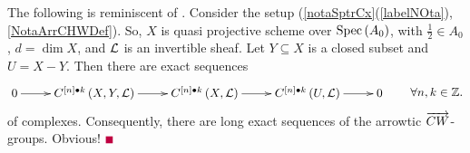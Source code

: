 \documentclass[12pt]{article}
\begin{document}
 

\vspace{3mm}
The following is reminiscent  of \cite[Cor 10.4.12]{F8}. 
\bL\label{1111Chwdm}{\rm 
Consider the setup (\ref{notaSptrCx}(\ref{labelNOta}), \ref{NotaArrCHWDef}). So, $X$ is quasi projective scheme over $\mathrm{Spec}\left(A_0\right)$, with $\frac{1}{2}\in A_0$, $d=\dim X$, and ${\mathcal{L}}$ is an invertible sheaf. 
Let $Y\subseteq X$ is a closed subset and $U=X-Y$.
Then   there are exact sequences 
\begin{equation}\label{YUXextSeq}
\diagram 
0 \ar[r] & C^{\LRt{n}{\bul}k}\LRf{X, Y, {\CL}} \ar[r] & C^{\LRt{n}{\bul}k}\LRf{X, {\CL}} \ar[r] &  C^{\LRt{n}{\bul}k}\LRf{U, {\CL}} \ar[r] & 0\\
\enddiagram
\qquad \forall n, k\in {\BZ}.
\end{equation} 
of complexes. 
Consequently, there are  long exact sequences of the arrowtic $\overrightarrow{CW}$-groups. 
}
\eL
\pf Obvious! $\eop$ 
\end{document}
